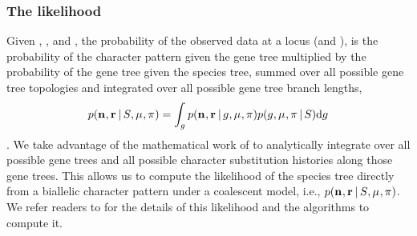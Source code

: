 \subsubsection{The likelihood}

\begin{linenomath}
Given \murate, \gfreq, and \sptree{},
the probability of the observed data at a locus (\leafallelecounts and
\leafredallelecounts), is the probability of the character pattern given the
gene tree multiplied by the probability of the gene tree given the species
tree, summed over all possible gene tree topologies and integrated over all
possible gene tree branch lengths,
\begin{equation}
    p(\mathbf{n}_{}, \mathbf{r}_{} \,|\, S_{}, \mu_{}, \pi_{})
    =
    \int_{g_{}}
    p(\mathbf{n}_{}, \mathbf{r}_{} \,|\, g_{}, \mu_{}, \pi_{})
    p(g_{}, \mu_{}, \pi_{} \,|\, S_{})
    \mathrm{d}g_{}
    \label{eq:markerlikelihood}
\end{equation}
\citep{Felsenstein1988,Nielsen2001,Rannala2003}.
We take advantage of the mathematical work of \citep{Bryant2012} to
analytically integrate over all possible gene trees and all possible character
substitution histories along those gene trees.
This allows us to compute the likelihood of the species tree directly from a
biallelic character pattern under a coalescent model,
i.e.,
$p(\mathbf{n}_{}, \mathbf{r}_{} \,|\, S_{}, \mu_{}, \pi_{})$.
We refer readers to
\citet{Bryant2012}
for the details of this likelihood and the algorithms to compute it.
\end{linenomath}

